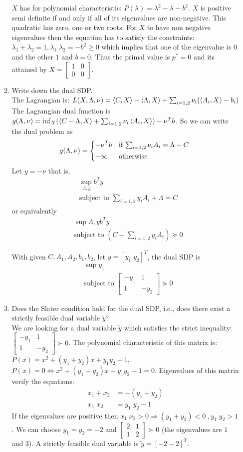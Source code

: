 \documentclass[11pt]{article}
\newcommand{\st}{\text{subject to }}
\newcommand{\twomat}[4]{\begin{bmatrix} #1 & #2 \\ #3 & #4 \end{bmatrix}}
\begin{document}
\begin{enumerate}
\begin{enumerate}
$X$ has for polynomial characteristic: $P(\lambda) = \lambda^2 - \lambda - b^2$.
$X$ is positive semi definite if and only if all of its eigenvalues are non-negative.
This quadratic has zero, one or two roots. For $X$ to have non negative eigenvalues then the equation has to satisfy the constraints: $\lambda_1 + \lambda_2 = 1, \lambda_1 \; \lambda_2 = -b^2 \ge 0$ 
which implies that one of the eigenvalue is $0$ and the other $1$ and $b=0$. Thus the primal value is $p^*=0$ and its attained by 
$X = \twomat{1}{0}{0}{0}$. 

\item Write down the dual SDP.\\

The Lagrangian is: $L(X, \Lambda, \nu) = \left \langle C, X\right \rangle - \left \langle \Lambda, X\right \rangle + \sum_{i=1,2} \nu_i (\left \langle A_i, X\right \rangle - b_i)$
The Lagrangian dual function is $g(\Lambda, \nu) = \inf_X (\left \langle C - \Lambda, X\right \rangle + \sum_{i=1,2} \nu_i \left \langle A_i, X\right \rangle) - \nu^T b$.
So we can write the dual problem as
	\[
		g(\Lambda, \nu) = \begin{dcases*}
			           	-\nu^T b& if $\sum_{i=1,2} \nu_i  A_i = \Lambda - C$ \\
		        		  	 -\infty & otherwise
		\end{dcases*}
	\]
Let $y=-\nu$ that is,
\begin{align*}
	& \sup_{\Lambda, y} b^T y \\
	& \st \sum_{i=1,2} y_i  A_i + \Lambda  = C
\end{align*}
or equivalently
\begin{align*}
	& \sup{\Lambda, y} b^T y \\
	& \st (C - \sum_{i=1,2} y_i  A_i)   \succeq 0
\end{align*}

With given $C, A_1, A_2, b_1, b_2$,  let $y =[y_1 \; y_2]^T$, the dual SDP is
\begin{align*}
	& \sup y_1 \\
	& \st \twomat{-y_1}{1}{1}{-y_2} \succeq 0
\end{align*}
			
\item Does the Slater condition hold for the dual SDP, i.e., does there exist a strictly feasible dual variable $\tilde y$?\\

We are looking for a dual variable $\tilde y$ which satisfies the strict inequality: $ \twomat{-y_1}{1}{1}{-y_2} \succ 0 $.
The polynomial characteristic of this matrix is: $P(x) = x^2 + (y_1+y_2) x + y_1 y_2 -1$, $P(x) = 0 \Leftrightarrow  x^2 + (y_1+y_2) x + y_1 y_2 -1 = 0$.
Eigenvalues of this matrix verify the equations:
\begin{align*}
	x_1 + x_2	&= - (y_1 + y_2) \\
	x_1 \; x_2 &= y_1 \; y_2 - 1
\end{align*}
If the eigenvalues are positive then $x_1 \; x_2 > 0 \Rightarrow  (y_1 + y_2) < 0 \; , y_1 \; y_2 > 1$.
We can choose $y_1 = y_2 = -2$ and $ \twomat{2}{1}{1}{2}  \succ 0$ (the eigenvalues are $1$ and $3$). A strictly feasible dual variable is $\tilde y = [-2 -2]^T$.



\end{enumerate}
\end{enumerate}
\end{document}
